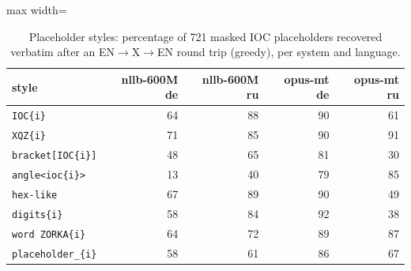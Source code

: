 \begin{table}[t]
\centering
\caption{Placeholder styles: percentage of 721 masked IOC placeholders recovered verbatim after an EN$\to$X$\to$EN round trip (greedy), per system and language.}
\label{tab:placeholders}
\small
\begin{adjustbox}{max width=\linewidth}
\begin{tabular}{lrrrr}
\toprule
style & nllb-600M de & nllb-600M ru & opus-mt de & opus-mt ru \\
\midrule
\texttt{IOC\{i\}} & 64 & 88 & 90 & 61 \\
\texttt{XQZ\{i\}} & 71 & 85 & 90 & 91 \\
\texttt{bracket[IOC\{i\}]} & 48 & 65 & 81 & 30 \\
\texttt{angle\textless ioc\{i\}\textgreater } & 13 & 40 & 79 & 85 \\
\texttt{hex-like} & 67 & 89 & 90 & 49 \\
\texttt{digits\{i\}} & 58 & 84 & 92 & 38 \\
\texttt{word ZORKA\{i\}} & 64 & 72 & 89 & 87 \\
\texttt{placeholder\_\{i\}} & 58 & 61 & 86 & 67 \\
\bottomrule
\end{tabular}
\end{adjustbox}
\end{table}
